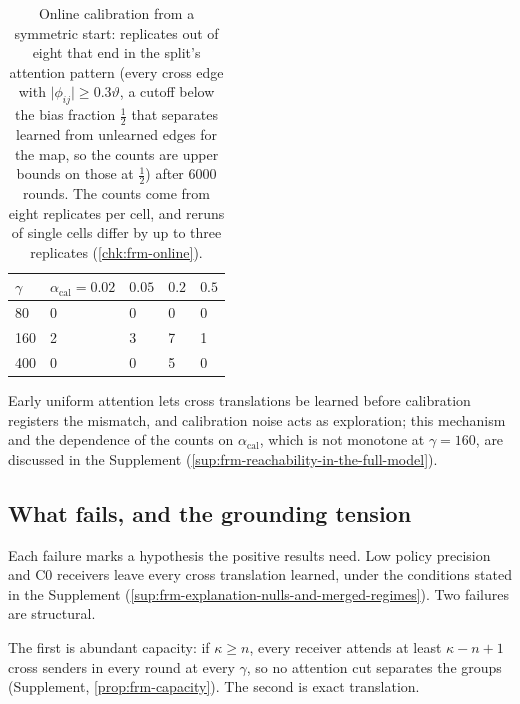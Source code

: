 \begin{table}[t]
\centering
\caption{Online calibration from a symmetric start: replicates out of eight that end in the split's attention pattern (every cross edge with $\vert\phi_{ij}\vert\ge0.3\vartheta$, a cutoff below the bias fraction $\frac12$ that separates learned from unlearned edges for the map, so the counts are upper bounds on those at $\frac12$) after 6000 rounds. The counts come from eight replicates per cell, and reruns of single cells differ by up to three replicates (\cref{chk:frm-online}).}
\label{tab:frm-online}
\begin{tabular}{@{}lllll@{}}
\toprule
$\gamma$ & $\alpha_{\mathrm{cal}}=0.02$ & $0.05$ & $0.2$ & $0.5$ \\
\midrule
80 & 0 & 0 & 0 & 0 \\
160 & 2 & 3 & 7 & 1 \\
400 & 0 & 0 & 5 & 0 \\
\bottomrule
\end{tabular}
\end{table}

Early uniform attention lets cross translations be learned before calibration registers the mismatch, and calibration noise acts as exploration; this mechanism and the dependence of the counts on $\alpha_{\mathrm{cal}}$, which is not monotone at $\gamma=160$, are discussed in the Supplement (\cref{sup:frm-reachability-in-the-full-model}).

\subsection{What fails, and the grounding tension}\label{sec:frm-fails}

Each failure marks a hypothesis the positive results need. Low policy precision and C0 receivers leave every cross translation learned, under the conditions stated in the Supplement (\cref{sup:frm-explanation-nulls-and-merged-regimes}). Two failures are structural.

The first is abundant capacity: if $\kappa\ge n$, every receiver attends at least $\kappa-n+1$ cross senders in every round at every $\gamma$, so no attention cut separates the groups (Supplement, \cref{prop:frm-capacity}). The second is exact translation.

